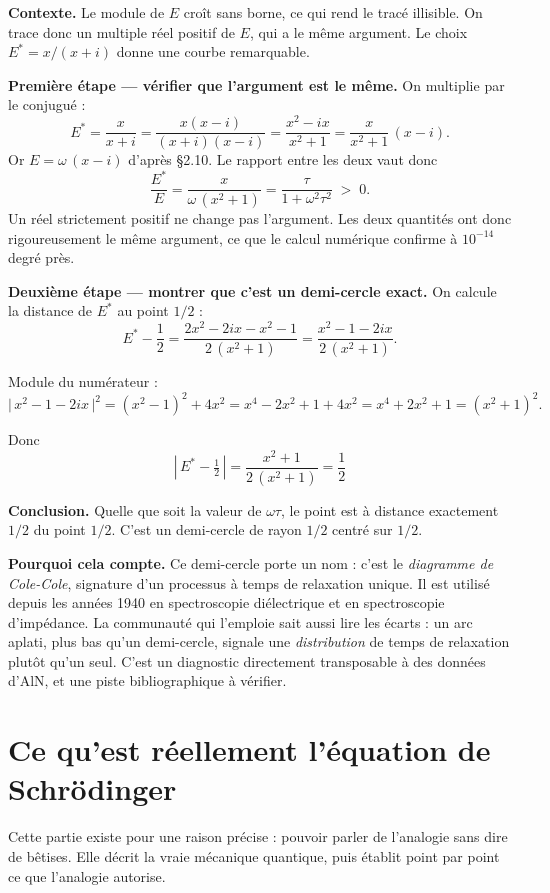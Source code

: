 \documentclass[11pt,a4paper]{article}
\begin{document}
\textbf{Contexte.} Le module de $E$ croît sans borne, ce qui rend le tracé illisible. On trace donc un
multiple réel positif de $E$, qui a le même argument. Le choix $E^{*} = x/(x+i)$ donne une courbe
remarquable.

\textbf{Première étape --- vérifier que l'argument est le même.} On multiplie par le conjugué :
\[ E^{*} = \frac{x}{x+i} = \frac{x(x-i)}{(x+i)(x-i)} = \frac{x^{2}-ix}{x^{2}+1}
= \frac{x}{x^{2}+1}\,(x-i) . \]
Or $E = \omega\,(x-i)$ d'après §2.10. Le rapport entre les deux vaut donc
\[ \frac{E^{*}}{E} = \frac{x}{\omega\,(x^{2}+1)} = \frac{\tau}{1+\omega^{2}\tau^{2}} \;>\; 0 . \]
Un réel strictement positif ne change pas l'argument. Les deux quantités ont donc rigoureusement le
même argument, ce que le calcul numérique confirme à $10^{-14}$ degré près.

\textbf{Deuxième étape --- montrer que c'est un demi-cercle exact.} On calcule la distance de $E^{*}$
au point $1/2$ :
\[ E^{*} - \frac{1}{2}
= \frac{2x^{2} - 2ix - x^{2} - 1}{2\,(x^{2}+1)}
= \frac{x^{2} - 1 - 2ix}{2\,(x^{2}+1)} . \]

Module du numérateur :
\[ \bigl|\,x^{2}-1-2ix\,\bigr|^{2} = (x^{2}-1)^{2} + 4x^{2}
= x^{4} - 2x^{2} + 1 + 4x^{2} = x^{4} + 2x^{2} + 1 = (x^{2}+1)^{2} . \]

Donc
\[ \boxed{\; \left|\,E^{*} - \tfrac{1}{2}\,\right| = \frac{x^{2}+1}{2\,(x^{2}+1)} = \frac{1}{2} \;} \]

\textbf{Conclusion.} Quelle que soit la valeur de $\omega\tau$, le point est à distance exactement
$1/2$ du point $1/2$. C'est un demi-cercle de rayon $1/2$ centré sur $1/2$.

\textbf{Pourquoi cela compte.} Ce demi-cercle porte un nom : c'est le \emph{diagramme de Cole-Cole},
signature d'un processus à temps de relaxation unique. Il est utilisé depuis les années 1940 en
spectroscopie diélectrique et en spectroscopie d'impédance. La communauté qui l'emploie sait aussi lire
les écarts : un arc aplati, plus bas qu'un demi-cercle, signale une \emph{distribution} de temps de
relaxation plutôt qu'un seul. C'est un diagnostic directement transposable à des données d'AlN, et une
piste bibliographique à vérifier.

\newpage
\section{Ce qu'est réellement l'équation de Schrödinger}

Cette partie existe pour une raison précise : pouvoir parler de l'analogie sans dire de bêtises. Elle
décrit la vraie mécanique quantique, puis établit point par point ce que l'analogie autorise.
\end{document}
